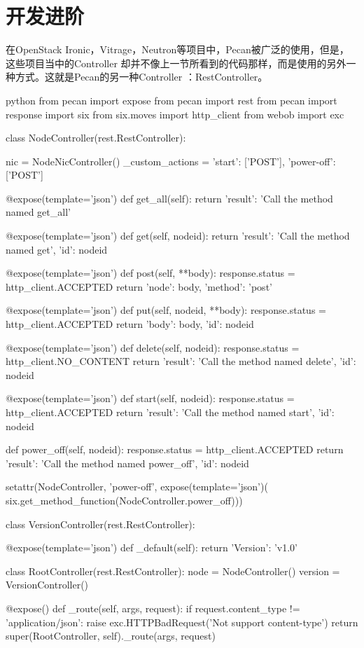 \section{开发进阶}
在OpenStack Ironic，Vitrage，Neutron等项目中，Pecan被广泛的使用，但是，这些项目当中的Controller
却并不像上一节所看到的代码那样，而是使用的另外一种方式。这就是Pecan的另一种Controller
：RestController。
\begin{code-block}{python}
from pecan import expose
from pecan import rest
from pecan import response
import six
from six.moves import http_client
from webob import exc


class NodeController(rest.RestController):

    nic = NodeNicController()
    _custom_actions = {
        'start': ['POST'],
        'power-off': ['POST']
    }

    @expose(template='json')
    def get_all(self):
        return {'result': 'Call the method named get_all'}

    @expose(template='json')
    def get(self, nodeid):
        return {'result': 'Call the method named get', 'id': nodeid}

    @expose(template='json')
    def post(self, **body):
        response.status = http_client.ACCEPTED
        return {'node': body, 'method': 'post'}

    @expose(template='json')
    def put(self, nodeid, **body):
        response.status = http_client.ACCEPTED
        return {'body': body, 'id': nodeid}

    @expose(template='json')
    def delete(self, nodeid):
        response.status = http_client.NO_CONTENT
        return {'result': 'Call the method named delete', 'id': nodeid}

    @expose(template='json')
    def start(self, nodeid):
        response.status = http_client.ACCEPTED
        return {'result': 'Call the method named start', 'id': nodeid}

    def power_off(self, nodeid):
        response.status = http_client.ACCEPTED
        return {'result': 'Call the method named power_off', 'id': nodeid}


setattr(NodeController, 'power-off',
        expose(template='json')(
            six.get_method_function(NodeController.power_off)))


class VersionController(rest.RestController):

    @expose(template='json')
    def _default(self):
        return {'Version': 'v1.0'}


class RootController(rest.RestController):
    node = NodeController()
    version = VersionController()

    @expose()
    def _route(self, args, request):
        if request.content_type != 'application/json':
            raise exc.HTTPBadRequest('Not support content-type')
        return super(RootController, self)._route(args, request)
\end{code-block}

